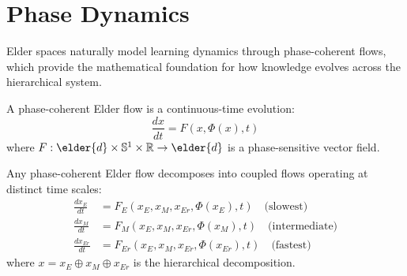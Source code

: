 \section{Phase Dynamics}

Elder spaces naturally model learning dynamics through phase-coherent flows, which provide the mathematical foundation for how knowledge evolves across the hierarchical system.

\begin{definition}
A phase-coherent Elder flow is a continuous-time evolution:
\begin{equation}
\frac{dx}{dt} = F(x, \Phi(x), t)
\end{equation}
where $F: \elder{d} \times \mathbb{S}^1 \times \mathbb{R} \rightarrow \elder{d}$ is a phase-sensitive vector field.
\end{definition}

\begin{theorem}
\label{thm:elder-flow-decomposition}
Any phase-coherent Elder flow decomposes into coupled flows operating at distinct time scales:
\begin{align}
\frac{dx_E}{dt} &= F_E(x_E, x_M, x_{Er}, \Phi(x_E), t) \quad \text{(slowest)}\\
\frac{dx_M}{dt} &= F_M(x_E, x_M, x_{Er}, \Phi(x_M), t) \quad \text{(intermediate)}\\
\frac{dx_{Er}}{dt} &= F_{Er}(x_E, x_M, x_{Er}, \Phi(x_{Er}), t) \quad \text{(fastest)}
\end{align}
where $x = x_E \oplus x_M \oplus x_{Er}$ is the hierarchical decomposition.
\end{theorem}

